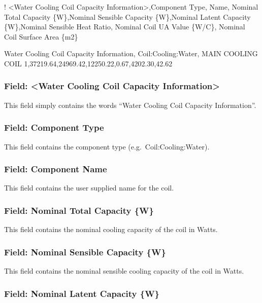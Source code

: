 ! \textless{}Water Cooling Coil Capacity Information\textgreater{},Component Type, Name, Nominal Total Capacity \{W\},Nominal Sensible Capacity \{W\},Nominal Latent Capacity \{W\},Nominal Sensible Heat Ratio, Nominal Coil UA Value \{W/C\}, Nominal Coil Surface Area \{m2\}

Water Cooling Coil Capacity Information, Coil:Cooling:Water, MAIN COOLING COIL 1,37219.64,24969.42,12250.22,0.67,4202.30,42.62

\subsubsection{Field: \textless{}Water Cooling Coil Capacity Information\textgreater{}}\label{field-water-cooling-coil-capacity-information}

This field simply contains the words ``Water Cooling Coil Capacity Information''.

\subsubsection{Field: Component Type}\label{field-component-type-2}

This field contains the component type (e.g.~Coil:Cooling:Water).

\subsubsection{Field: Component Name}\label{field-component-name-2}

This field contains the user supplied name for the coil.

\subsubsection{Field: Nominal Total Capacity \{W\}}\label{field-nominal-total-capacity-w-1}

This field contains the nominal cooling capacity of the coil in Watts.

\subsubsection{Field: Nominal Sensible Capacity \{W\}}\label{field-nominal-sensible-capacity-w}

This field contains the nominal sensible cooling capacity of the coil in Watts.

\subsubsection{Field: Nominal Latent Capacity \{W\}}\label{field-nominal-latent-capacity-w}

